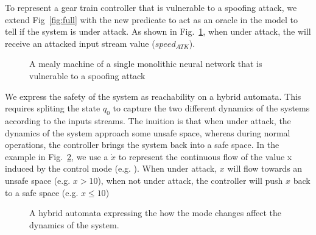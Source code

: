 To represent a gear train controller that is vulnerable to a spoofing attack, we extend Fig~\ref{fig:full} with the new predicate \isUnderAttack to act as an oracle in the model to tell if the system is under attack.
As shown in Fig.~\ref{fig:fullAtk}, when under attack, the \fullNN will receive an attacked input stream value ($speed_{ATK}$).

\begin{figure}[h!]
\centering
{}
\caption{A mealy machine of a single monolithic neural network that is vulnerable to a spoofing attack}
\label{fig:fullAtk}
\end{figure}

We express the safety of the system as reachability on a hybrid automata.
This requires spliting the state $q_0$ to capture the two different dynamics of the systems according to the inputs streams.
The inuition is that when under attack, the dynamics of the system approach some unsafe space, whereas during normal operations, the controller brings the system back into a safe space.
In the example in Fig.~\ref{fig:hybridGear}, we use a $\dot{x}$ to represent the continuous flow of the value x induced by the control mode (e.g. \fullNN).
When under attack, $x$ will flow towards an unsafe space (e.g. $x > 10$), when not under attack, the controller will push $x$ back to a safe space (e.g. $x\leq 10$)

\begin{figure}[h!]
\centering
{}
\caption{A hybrid automata expressing the how the mode changes affect the dynamics of the system.}
\label{fig:hybridGear}
\end{figure}


